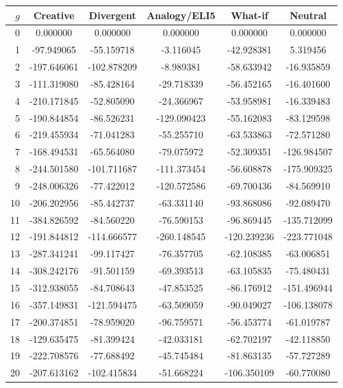 \documentclass{article}
\theoremstyle{plain}
\theoremstyle{definition}
\theoremstyle{remark}
\begin{document}
\begin{table}[ht!]
\centering
\scriptsize
\setlength{\tabcolsep}{6pt}
\begin{tabular}{rccccc}
\toprule
$g$ &
Creative &
Divergent &
Analogy/ELI5 &
What-if &
Neutral \\
\midrule
0 & 0.000000 & 0.000000 & 0.000000 & 0.000000 & 0.000000 \\
1 & -97.949065 & -55.159718 & -3.116045 & -42.928381 & 5.319456 \\
2 & -197.646061 & -102.878209 & -8.989381 & -58.633942 & -16.935859 \\
3 & -111.319080 & -85.428164 & -29.718339 & -56.452165 & -16.401600 \\
4 & -210.171845 & -52.805090 & -24.366967 & -53.958981 & -16.339483 \\
5 & -190.844854 & -86.526231 & -129.090423 & -55.162083 & -83.129598 \\
6 & -219.455934 & -71.041283 & -55.255710 & -63.533863 & -72.571280 \\
7 & -168.494531 & -65.564080 & -79.075972 & -52.309351 & -126.984507 \\
8 & -244.501580 & -101.711687 & -111.373454 & -56.608878 & -175.909325 \\
9 & -248.006326 & -77.422012 & -120.572586 & -69.700436 & -84.569910 \\
10 & -206.202956 & -85.442737 & -63.331140 & -93.868086 & -92.089470 \\
11 & -384.826592 & -84.560220 & -76.590153 & -96.869445 & -135.712099 \\
12 & -191.844812 & -114.666577 & -260.148545 & -120.239236 & -223.771048 \\
13 & -287.341241 & -99.117427 & -76.357705 & -62.108385 & -63.006851 \\
14 & -308.242176 & -91.501159 & -69.393513 & -63.105835 & -75.480431 \\
15 & -312.938055 & -84.708643 & -47.853525 & -86.176912 & -151.496944 \\
16 & -357.149831 & -121.594475 & -63.509059 & -90.049027 & -106.138078 \\
17 & -200.374851 & -78.959020 & -96.759571 & -56.453774 & -61.019787 \\
18 & -129.635475 & -81.399424 & -42.033181 & -62.702197 & -42.118850 \\
19 & -222.708576 & -77.688492 & -45.745484 & -81.863135 & -57.727289 \\
20 & -207.613162 & -102.415834 & -51.668224 & -106.350109 & -60.770080 \\

\end{tabular}
\end{table}
\end{document}
